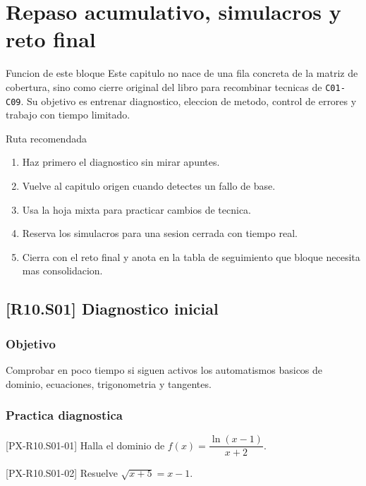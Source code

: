 \chapter{Repaso acumulativo, simulacros y reto final}

\begin{theorybox}{Funcion de este bloque}
Este capitulo no nace de una fila concreta de la matriz de cobertura, sino como cierre original
del libro para recombinar tecnicas de \texttt{C01-C09}. Su objetivo es entrenar diagnostico,
eleccion de metodo, control de errores y trabajo con tiempo limitado.
\end{theorybox}

\begin{methodbox}{Ruta recomendada}
\begin{enumerate}
  \item Haz primero el diagnostico sin mirar apuntes.
  \item Vuelve al capitulo origen cuando detectes un fallo de base.
  \item Usa la hoja mixta para practicar cambios de tecnica.
  \item Reserva los simulacros para una sesion cerrada con tiempo real.
  \item Cierra con el reto final y anota en la tabla de seguimiento que bloque necesita mas
  consolidacion.
\end{enumerate}
\end{methodbox}

\section{[R10.S01] Diagnostico inicial}

\subsection*{Objetivo}
Comprobar en poco tiempo si siguen activos los automatismos basicos de dominio, ecuaciones,
trigonometria y tangentes.

\subsection*{Practica diagnostica}
\begin{exercise}{[PX-R10.S01-01] Halla el dominio de \(f(x)=\dfrac{\ln(x-1)}{x+2}\).}
\end{exercise}

\begin{exercise}{[PX-R10.S01-02] Resuelve \(\sqrt{x+5}=x-1\).}
\end{exercise}

